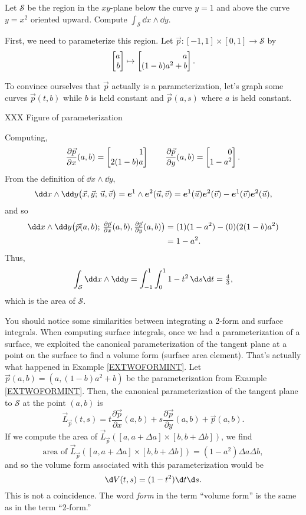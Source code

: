 \begin{example}
	\label{EXTWOFORMINT}
	Let $\mathcal S$ be the region in the $xy$-plane below 
	the curve $y=1$ and above the curve $y=x^2$ oriented upward.
	Compute $\int_{\mathcal S} \dd x\wedge \dd y$.

	First, we need to parameterize this region.  Let 
	$\vec p:[-1,1]\times[0,1]\to\mathcal S$ by
	\[
		\mat{a\\b}\mapsto \mat{a\\ (1-b)a^2+b}.
	\]

	To convince ourselves that $\vec p$ actually is a parameterization,
	let's graph some curves $\vec p(t,b)$ while $b$ is held constant and
	$\vec p(a,s)$ where $a$ is held constant.

	XXX Figure of parameterization

	Computing, 
	\[
	\frac{\partial \vec p}{\partial x} (a,b) = \mat{1\\ 2(1-b)a} \qquad
	\frac{\partial \vec p}{\partial y} (a,b) = \mat{0\\ 1-a^2}.
	\]
	From the definition of $\dd x\wedge \dd y$,
	\[
		\dd x\wedge \dd y\formarg{\vec x,\vec y}{\vec u,\vec v}
		=\bm e^1\wedge \bm e^2(\vec u,\vec v)
		= \bm e^1(\vec u)\bm e^2(\vec v) - \bm e^1(\vec v)\bm e^2(\vec u),
	\]
	and so
	\begin{align*}
	\dd x\wedge \dd y\formarg{\vec p(a,b)}{\tfrac{\partial \vec p}{\partial x}(a,b),
		\tfrac{\partial\vec p}{\partial y}(a,b)}
		&=(1)(1-a^2) - (0)(2(1-b)a^2)\\ &= 1-a^2.
	\end{align*}
	Thus, 
	\[
		\int_{\mathcal S} \dd x\wedge \dd y = \int_{-1}^1\int_0^1
		1-t^2\,\d s\d t = \tfrac{4}{3},
	\]
	which is the area of $\mathcal S$.
\end{example}

You should notice some similarities between integrating a 2-form and surface
integrals.  When computing surface integrals, once we had a parameterization
of a surface, we exploited the canonical
parameterization of the tangent plane at a point on the surface to find
a volume form (surface area element).  That's actually what happened in
Example \ref{EXTWOFORMINT}.  Let $\vec p(a,b)=(a, (1-b)a^2+b)$ be the parameterization
from Example \ref{EXTWOFORMINT}.  Then, the canonical
parameterization of the tangent plane to $\mathcal S$ at the point $(a,b)$ is
\[
	\vec L_{\vec p}(t,s) = t\frac{\partial \vec p}{\partial x}(a,b)+
		s\frac{\partial\vec p}{\partial y}(a,b) + \vec p(a,b).
\]
If we compute the area of $\vec L_{\vec p}([a,a+\Delta a]\times [b,b+\Delta b])$,
we find
\[
	\text{area of }\vec L_{\vec p}([a,a+\Delta a]\times [b,b+\Delta b])
	= (1-a^2)\Delta a\Delta b,
\]
and so the volume form associated with this parameterization would be \[\d V(t,s) 
= (1-t^2)\d t\d s.\]
This is not a coincidence.  The word \emph{form} in the term ``volume form''
is the same as in the term ``2-form.''

